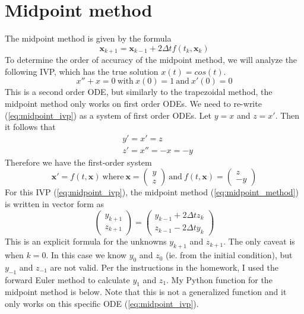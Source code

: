 \documentclass{article}
\begin{document}
\section{Midpoint method}
The midpoint method is given by the formula
\begin{equation} \label{eq:midpoint_method}
\bm{x}_{k+1} = \bm{x}_{k-1} + 2{\Delta t}f(t_k,\bm{x}_k)
\end{equation}
To determine the order of accuracy of the midpoint method, we will analyze the following IVP, which has the true solution \begin{math}
x(t) = cos(t)\end{math}. \begin{equation} \label{eq:midpoint_ivp}
x'' + x = 0\ \textrm{with}\ x(0) = 1\  \textrm{and}\ x'(0) = 0
\end{equation}
This is a second order ODE, but similarly to the trapezoidal method, the midpoint method only works on first order ODEs.  We need to re-write (\ref{eq:midpoint_ivp}) as a system of first order ODEs. Let \(y = x\) and \(z = x'\). Then it follows that
\begin{equation}
\begin{split}
& y' = x' = z \\
& z' = x'' = -x = -y
\end{split}
\end{equation}
Therefore we have the first-order system
\begin{equation}
\bm{x}' = f(t, \bm{x})\ \textrm{where}\ \bm{x} = \begin{pmatrix}y \\ z\end{pmatrix}\ \textrm{and}\ f(t,\bm{x}) = \begin{pmatrix}z \\ -y\end{pmatrix}
\end{equation}
For this IVP (\ref{eq:midpoint_ivp}), the midpoint method (\ref{eq:midpoint_method}) is written in vector form as
\begin{equation} \label{eq:midpoint_method_vector_form}
\begin{pmatrix}y_{k+1} \\ z_{k+1}\end{pmatrix} = \begin{pmatrix}y_{k-1} + 2{\Delta t}z_k \\ z_{k-1} - 2{\Delta t}y_k\end{pmatrix}
\end{equation}
This is an explicit formula for the unknowns $y_{k+1}$ and $z_{k+1}$. The only caveat is when $k = 0$.  In this case we know $y_0$ and $z_0$ (ie. from the initial condition), but $y_{-1}$ and $z_{-1}$ are not valid.  Per the instructions in the homework, I used the forward Euler method to calculate $y_1$ and $z_1$. My Python function for the midpoint method is below.  Note that this is not a generalized function and it only works on this specific ODE (\ref{eq:midpoint_ivp}).
\end{document}
